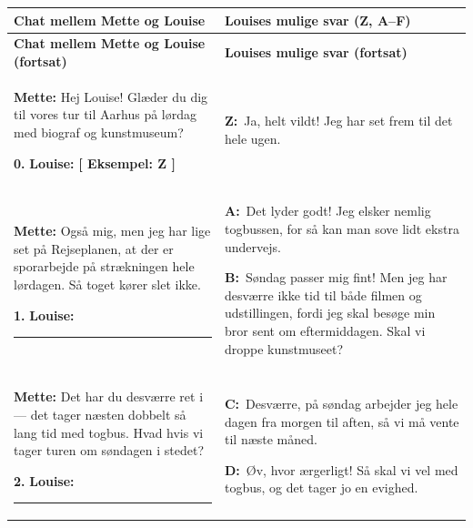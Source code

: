 \vspace{0.25em}
{\small
\renewcommand{\arraystretch}{1.35}
\begin{longtable}{@{} >{\raggedright\arraybackslash}p{8.25cm} @{\hspace{0.5cm}} >{\raggedright\arraybackslash}p{8.25cm} @{}}
\toprule
\textbf{\color{NCDNavy}Chat mellem Mette og Louise} & \textbf{\color{NCDNavy}Louises mulige svar (Z, A--F)} \\
\midrule
\endfirsthead
\toprule
\textbf{\color{NCDNavy}Chat mellem Mette og Louise (fortsat)} & \textbf{\color{NCDNavy}Louises mulige svar (fortsat)} \\
\midrule
\endhead
\bottomrule
\endfoot

\textbf{\color{NCDNavy}Mette:}\newline
Hej Louise! Glæder du dig til vores tur til Aarhus på lørdag med biograf og kunstmuseum?\par\vspace{4pt}
\textbf{0.} \textbf{\color{NCDTeal}Louise:} \textcolor{NCDRed}{\textbf{[ Eksempel: Z ]}} &
\textbf{\color{NCDRed}Z:}\ Ja, helt vildt! Jeg har set frem til det hele ugen. \\
\midrule

\textbf{\color{NCDNavy}Mette:}\newline
Også mig, men jeg har lige set på Rejseplanen, at der er sporarbejde på strækningen hele lørdagen. Så toget kører slet ikke.\par\vspace{4pt}
\textbf{1.} \textbf{\color{NCDTeal}Louise:} \rule{1.2cm}{0.4pt} &
\textbf{\color{NCDNavy}A:}\ Det lyder godt! Jeg elsker nemlig togbussen, for så kan man sove lidt ekstra undervejs.\par\vspace{6pt}
\textbf{\color{NCDNavy}B:}\ Søndag passer mig fint! Men jeg har desværre ikke tid til både filmen og udstillingen, fordi jeg skal besøge min bror sent om eftermiddagen. Skal vi droppe kunstmuseet? \\
\midrule

\textbf{\color{NCDNavy}Mette:}\newline
Det har du desværre ret i --- det tager næsten dobbelt så lang tid med togbus. Hvad hvis vi tager turen om søndagen i stedet?\par\vspace{4pt}
\textbf{2.} \textbf{\color{NCDTeal}Louise:} \rule{1.2cm}{0.4pt} &
\textbf{\color{NCDNavy}C:}\ Desværre, på søndag arbejder jeg hele dagen fra morgen til aften, så vi må vente til næste måned.\par\vspace{6pt}
\textbf{\color{NCDNavy}D:}\ Øv, hvor ærgerligt! Så skal vi vel med togbus, og det tager jo en evighed. \\
\midrule


\end{longtable}}
